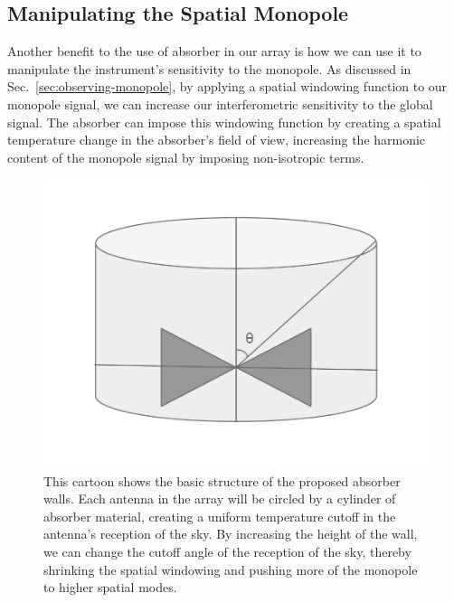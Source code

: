 \subsection{Manipulating the Spatial Monopole}

Another benefit to the use of absorber in our array is how we can use it to 
manipulate the instrument's sensitivity to the monopole.  As discussed in 
Sec.~\ref{sec:observing-monopole}, by applying a spatial windowing function to 
our monopole signal, we can increase our interferometric sensitivity to the 
global signal. The absorber can impose this windowing function by creating a 
spatial temperature change in the absorber's field of view, increasing the 
harmonic content of the monopole signal by imposing non-isotropic terms.

\begin{figure}
    \begin{center}
    \includegraphics[width=\linewidth]{absorber-structure.png}
    \end{center}
    \caption{
        This cartoon shows the basic structure of the proposed absorber walls.  
        Each antenna in the array will be circled by a cylinder of absorber 
        material, creating a uniform temperature cutoff in the antenna's 
        reception of the sky. By increasing the height of the wall, we can 
        change the cutoff angle of the reception of the sky, thereby shrinking 
        the spatial windowing and pushing more of the monopole to higher 
        spatial modes.
    }
    \label{fig:absorber-structure}
\end{figure}

